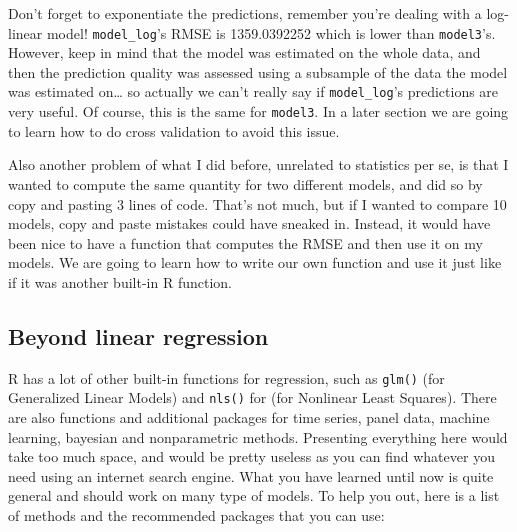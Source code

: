 \documentclass[]{gitbook}
\begin{document}
Don't forget to exponentiate the predictions, remember you're dealing with a log-linear model! \texttt{model\_log}'s
RMSE is 1359.0392252 which is lower than \texttt{model3}'s. However, keep in mind that the model was estimated
on the whole data, and then the prediction quality was assessed using a subsample of the data the
model was estimated on\ldots{} so actually we can't really say if \texttt{model\_log}'s predictions are very useful.
Of course, this is the same for \texttt{model3}.
In a later section we are going to learn how to do cross validation to avoid this issue.

Also another problem of what I did before, unrelated to statistics per se, is that I wanted to compute
the same quantity for two different models, and did so by copy and pasting 3 lines of code. That's not
much, but if I wanted to compare 10 models, copy and paste mistakes could have sneaked in. Instead,
it would have been nice to have a function that computes the RMSE and then use it on my models. We
are going to learn how to write our own function and use it just like if it was another built-in
R function.

\hypertarget{beyond-linear-regression}{%
\subsection{Beyond linear regression}\label{beyond-linear-regression}}

R has a lot of other built-in functions for regression, such as \texttt{glm()} (for Generalized Linear
Models) and \texttt{nls()} for (for Nonlinear Least Squares). There are also functions and additional
packages for time series, panel data, machine learning, bayesian and nonparametric methods.
Presenting everything here would take too much space, and would be pretty useless as you can find
whatever you need using an internet search engine. What you have learned until now is quite general
and should work on many type of models. To help you out, here is a list of methods and the
recommended packages that you can use:
\end{document}
